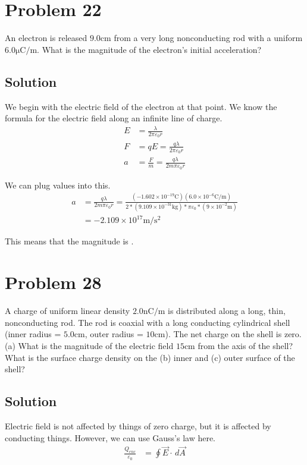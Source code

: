 \documentclass[12pt]{article}
\begin{document}
\pagebreak
\section{Problem 22}
An electron is released $9.0 \unit{\centi\meter}$ from a very long nonconducting rod with a uniform $6.0 \unit{\micro\coulomb/\meter}$. What is the magnitude of the electron's initial acceleration?

\subsection*{Solution}
We begin with the electric field of the electron at that point. We know the formula for the electric field along an infinite line of charge.
\begin{align*}
    E   &=  \frac{\lambda}{2\pi\varepsilon_0 r}\\
    F   &=  qE
        =   \frac{q\lambda}{2\pi\varepsilon_0 r}\\
    a   &=  \frac{F}{m}
        =   \frac{q\lambda}{2m\pi\varepsilon_0 r}
\end{align*}

We can plug values into this.
\begin{align*}
    a   &=  \frac{q\lambda}{2m\pi\varepsilon_0 r}
        =   \frac{(-1.602 \times 10^{-19} \unit{\coulomb})(6.0 \times 10^{-6}\unit{\coulomb/\meter})}{2*(9.109 \times 10^{-31} \unit{\kilo\gram}) * \pi\varepsilon_0 * (9 \times 10^{-2} \unit{\meter})}\\
        &=  -2.109 \times 10^{17} \unit{\meter/\second^2}
\end{align*}

This means that the magnitude is .

\pagebreak
\section{Problem 28}
A charge of uniform linear density $2.0 \unit{\nano\coulomb/\meter}$ is distributed along a long, thin, nonconducting rod. The rod is coaxial with a long conducting cylindrical shell (inner radius = $5.0 \unit{\centi\meter}$, outer radius = $10 \unit{\centi\meter}$). The net charge on the shell is zero. (a) What is the magnitude of the electric field $15 \unit{\centi\meter}$ from the axis of the shell? What is the surface charge density on the (b) inner and (c) outer surface of the shell?

\subsection{Solution}
Electric field is not affected by things of zero charge, but it is affected by conducting things. However, we can use Gauss's law here.
\begin{align*}
    \frac{Q_{enc}}{\varepsilon_0}   &=  \oint \vec{E} \cdot \,d\vec{A}
\end{align*}
\end{document}
